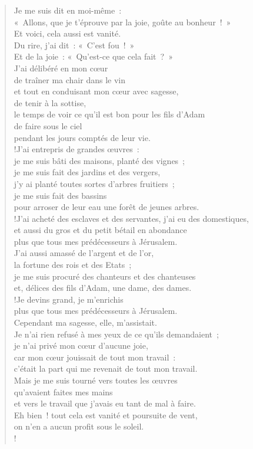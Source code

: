 \documentclass[french,twoside]{book} %
\begin{document}
\begin{verse}
Je me suis dit en moi-même : \\
« Allons, que je t’éprouve par la joie, goûte au bonheur ! » \\
Et voici, cela aussi est vanité.\\
Du rire, j’ai dit : « C’est fou ! » \\
Et de la joie : « Qu’est-ce que cela fait ? »\\
J’ai délibéré en mon cœur \\
de traîner ma chair dans le vin \\
et tout en conduisant mon cœur avec sagesse, \\
de tenir à la sottise, \\
le temps de voir ce qu’il est bon pour les fils d’Adam \\
de faire sous le ciel \\
pendant les jours comptés de leur vie.\\!J’ai entrepris de grandes œuvres : \\
je me suis bâti des maisons, planté des vignes ;\\
je me suis fait des jardins et des vergers, \\
j’y ai planté toutes sortes d’arbres fruitiers ;\\
je me suis fait des bassins \\
pour arroser de leur eau une forêt de jeunes arbres.\\!J’ai acheté des esclaves et des servantes, j’ai eu des domestiques, \\
et aussi du gros et du petit bétail en abondance \\
plus que tous mes prédécesseurs à Jérusalem.\\
J’ai aussi amassé de l’argent et de l’or, \\
la fortune des rois et des Etats ; \\
je me suis procuré des chanteurs et des chanteuses \\
et, délices des fils d’Adam, une dame, des dames.\\!Je devins grand, je m’enrichis \\
plus que tous mes prédécesseurs à Jérusalem. \\
Cependant ma sagesse, elle, m’assistait.\\
Je n’ai rien refusé à mes yeux de ce qu’ils demandaient ; \\
je n’ai privé mon cœur d’aucune joie, \\
car mon cœur jouissait de tout mon travail : \\
c’était la part qui me revenait de tout mon travail.\\
Mais je me suis tourné vers toutes les œuvres \\
qu’avaient faites mes mains \\
et vers le travail que j’avais eu tant de mal à faire. \\
Eh bien ! tout cela est vanité et poursuite de vent, \\
on n’en a aucun profit sous le soleil.\\!
\end{verse}
\end{document}
